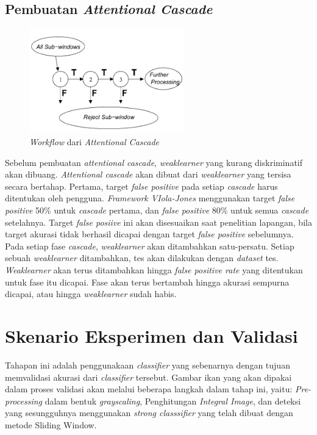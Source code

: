 \subsection{Pembuatan \emph{Attentional Cascade}}

\begin{figure}[H]
  \centering{}
	\includegraphics[width=0.6\textwidth]{gambar/cascade}
  \caption{\textit{Workflow} dari \emph{Attentional Cascade}}
\end{figure}

Sebelum pembuatan \emph{attentional cascade}, \emph{weaklearner} yang kurang 
diskriminatif akan dibuang. 
\emph{Attentional cascade} akan dibuat dari \emph{weaklearner} 
yang tersisa secara bertahap. 
Pertama, target \textit{false positive} pada setiap \emph{cascade} 
harus ditentukan oleh pengguna. \emph{Framework VIola-Jones} menggunakan target 
\textit{false positive} 50\% untuk \emph{cascade} pertama, dan 
\textit{false positive} 80\% untuk semua \emph{cascade} setelahnya.
Target \textit{false posiive} ini akan disesuaikan 
saat penelitian lapangan, bila target akurasi tidak berhasil dicapai 
dengan target \textit{false positive} sebelumnya.
Pada setiap fase \emph{cascade}, \emph{weaklearner} akan 
ditambahkan satu-persatu. Setiap sebuah \emph{weaklearner} ditambahkan, tes akan dilakukan 
dengan \emph{dataset} tes. \emph{Weaklearner} akan terus ditambahkan hingga \emph{false positive rate} 
yang ditentukan untuk fase itu dicapai. Fase akan terus bertambah hingga 
akurasi sempurna dicapai, atau hingga \emph{weaklearner} sudah habis. 


\section{Skenario Eksperimen dan Validasi}

Tahapan ini adalah penggunakaan \emph{classifier} yang sebenarnya dengan tujuan 
memvalidasi akurasi dari \emph{classifier} tersebut. 
Gambar ikan yang akan dipakai dalam proses validasi akan 
melalui beberapa langkah dalam tahap ini, 
yaitu: \textit{Pre-processing} dalam bentuk \emph{grayscaling}, Penghitungan 
\emph{Integral Image}, dan deteksi yang sesungguhnya menggunakan \emph{strong classsifier} 
yang telah dibuat dengan metode Sliding Window.

